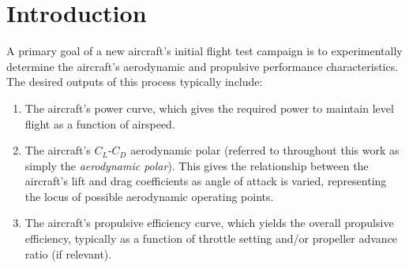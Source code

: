 \documentclass[conf]{new-aiaa}
\begin{document}
%


    \section{Introduction}

    A primary goal of a new aircraft's initial flight test campaign is to experimentally determine the aircraft's aerodynamic and propulsive performance characteristics. The desired outputs of this process typically include:

    \begin{enumerate}
        \item The aircraft's power curve, which gives the required power to maintain level flight as a function of airspeed.
        \item The aircraft's $C_L$-$C_D$ aerodynamic polar (referred to throughout this work as simply the \textit{aerodynamic polar}). This gives the relationship between the aircraft's lift and drag coefficients as angle of attack is varied, representing the locus of possible aerodynamic operating points.
        \item The aircraft's propulsive efficiency curve, which yields the overall propulsive efficiency, typically as a function of throttle setting and/or propeller advance ratio (if relevant).
    \end{enumerate}
\end{document}
